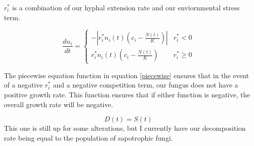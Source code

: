 \documentclass{article}
\begin{document}
\noindent
$ r^*_i $ is a combination of our hyphal extension rate and our enviornmental stress term.

\begin{equation}\label{piecewise}
\frac{dn_i}{dt} = \begin{cases} 
          -\left|r^*_i n_i(t) \left(c_i - \frac{N(t)}{K} \right) \right| & r^*_i  < 0\\
          r^*_i n_i(t) \left(c_i - \frac{N(t)}{K} \right) & r^*_i \geq 0 
       \end{cases}
\end{equation}

\noindent
 The piecewise equation function in equation \ref{piecewise} ensures that in the event of a negative $ r^*_i $ and a negative competition term, our fungus does not have a positive growth rate. This function ensures that if either function is negative, the overall growth rate will be negative. 

 \begin{equation}
     D(t) = S(t)
 \end{equation}
 \noindent
 This one is still up for some alterations, but I currently have our decomposition rate being equal to the population of sapotrophic fungi.
 
 
\end{document}
